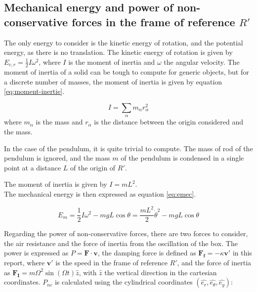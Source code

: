 \documentclass[a4paper,12pt,twoside]{article}
\begin{document}
\subsection{Mechanical energy and power of non-conservative forces in the frame of reference $R'$}
The only energy to consider is the kinetic energy of rotation, and the potential energy, as there is no translation.
The kinetic energy of rotation is given by $E_{c,r} = \frac{1}{2}I\omega^2$, where $I$ is the moment of inertia and $\omega$ the angular velocity.
The moment of inertia of a solid can be tough to compute for generic objects, but for a discrete number of masses, the moment of inertia is given by equation \ref{eq:moment-inertie}. \cite{ans:moment-inertie} %

\begin{equation}
	I = \sum_\alpha m_\alpha r_\alpha^2
	\label{eq:moment-inertie}
\end{equation}
where $m_\alpha$ is the mass and $r_\alpha$ is the distance between the origin considered and the mass.

In the case of the pendulum, it is quite trivial to compute.
The mass of rod of the pendulum is ignored, and the mass $m$ of the pendulum is condensed in a single point at a distance $L$ of the origin of $R'$.

The moment of inertia is given by $I=mL^2$.\\ %

The mechanical energy is then expressed as equation \ref{eq:emec}.

\begin{equation}
	E_m = \frac{1}{2}I\omega^2 - mgL\cos\theta =  \frac{mL^2}{2}\dot{\theta}^2 - mgL\cos\theta
	\label{eq:emec}
\end{equation}

Regarding the power of non-conservative forces, there are two forces to consider, the air resistance and the force of inertia from the oscillation of the box.
The power is expressed as $P = \mathbf{F}\cdot\mathbf{v}$, the damping force is defined as $\mathbf{F_f} = -\kappa\mathbf{v'}$ in this report, where $\mathbf{v'}$ is the speed in the frame of reference $R'$, and the force of inertia as $\mathbf{F_I} = m \Omega^2 \sin(\Omega t) \hat{z}$, with $\hat{z}$ the vertical direction in the cartesian coordinates. $P_{nc}$ is calculated using the cylindrical coordinates $(\hat{e_r}, \hat{e_\theta}, \hat{e_y})$:
\end{document}
